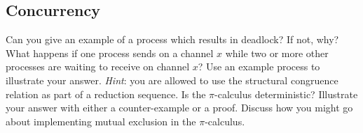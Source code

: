 \documentclass[10pt,a4paper]{exam} %
\begin{document}
\begin{questions}
\section*{Concurrency}

\question[1] Can you give an example of a process which results in deadlock? If not, why? \droppoints
\question[2] What happens if one process sends on a channel $x$ while two or more other processes are waiting to receive on channel $x$? Use an example process to illustrate your answer. \emph{Hint}: you are allowed to use the structural congruence relation as part of a reduction sequence. \droppoints
\question[2] Is the $\pi$-calculus deterministic? Illustrate your answer with either a counter-example or a proof. \droppoints 
\question[5] Discuss how you might go about implementing mutual exclusion in the $\pi$-calculus. \droppoints 

\end{questions}
\end{document}
